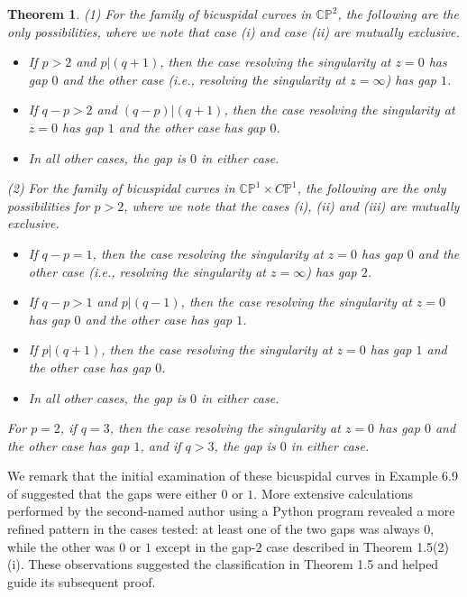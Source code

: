 \documentclass[11pt]{amsart}
\theoremstyle{plain}
\newtheorem{theorem}{Theorem}
\numberwithin{theorem}{section}
\theoremstyle{definition}
\newcommand{\C}{{\mathbb C}}
\renewcommand{\P}{{\mathbb P}}
\begin{document}
\begin{theorem}
(1) For the family of bicuspidal curves in $\C\P^2$, the following are the only possibilities, where we note that case (i) and case (ii) are mutually exclusive. 
\begin{itemize}
\item [{(i)}] If $p>2$ and $p| (q+1)$, then the case resolving the singularity at $z=0$ has gap $0$ and the other case (i.e., resolving the singularity at $z=\infty$) has gap $1$. 
\item [{(ii)}] If $q-p>2$ and $(q-p) | (q+1)$, then the case resolving the singularity at $z=0$ has gap $1$ and the other case has gap $0$. 
\item [{(iii)}] In all other cases, the gap is $0$ in either case. 
\end{itemize}

(2) For the family of bicuspidal curves in $\C\P^1\times C\P^1$, the following are the only possibilities
for $p>2$, where we note that the cases (i), (ii) and (iii) are mutually exclusive. 
\begin{itemize}
\item [{(i)}] If $q-p=1$, then the case resolving the singularity at $z=0$ has gap $0$ and the other case (i.e., resolving the singularity at $z=\infty$) has gap $2$. 
\item [{(ii)}] If $q-p>1$ and $p | (q-1)$, then the case resolving the singularity at $z=0$ has gap $0$ and the other case has gap $1$. 
\item [{(iii)}] If $p| (q+1)$, then the case resolving the singularity at $z=0$ has gap $1$ and the other case has gap $0$. 
\item [{(iv)}] In all other cases, the gap is $0$ in either case. 
\end{itemize}
For $p=2$, if $q=3$, then the case resolving the singularity at $z=0$ has gap $0$ and the other case has gap $1$, and if $q>3$, the gap is $0$ in either case. 
\end{theorem}

We remark that the initial examination of these bicuspidal curves in Example 6.9 of \cite{C} suggested that the gaps were either $0$ or $1$. More extensive calculations performed by the second-named author using a Python program revealed a more refined pattern in the cases tested: at least one of the two gaps was always $0$, while the other was $0$ or $1$ except in the gap-$2$ case described in Theorem 1.5(2)(i). These observations suggested the classification in Theorem 1.5 and helped guide its subsequent proof.
\end{document}
